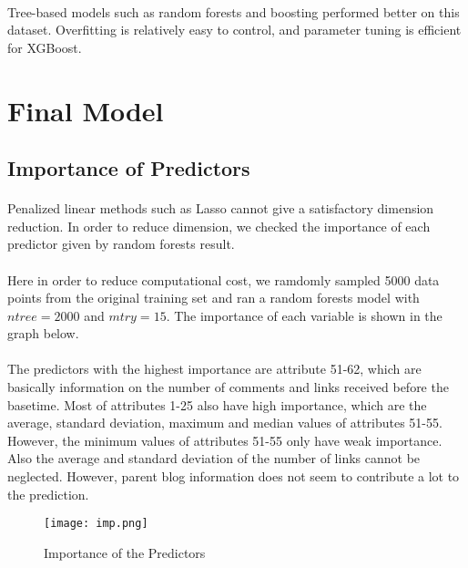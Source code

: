 \documentclass[paper=a4, fontsize=11pt]{scrartcl} %
\numberwithin{equation}{section} %
\numberwithin{figure}{section} %
\numberwithin{table}{section} %
\begin{document}
{\paragraph{}
Tree-based models such as random forests and boosting performed better on this dataset. Overfitting is relatively easy to control, and parameter tuning is efficient for XGBoost.

%
%
\section{Final Model}
\subsection{Importance of Predictors}
\paragraph{}
Penalized linear methods such as Lasso cannot give a satisfactory dimension reduction. In order to reduce dimension, we checked the importance of each predictor given by random forests result. 
\paragraph{}
Here in order to reduce computational cost, we ramdomly sampled 5000 data points from the original training set and ran a random forests model with \(ntree = 2000\) and \(mtry = 15\). The importance of each variable is shown in the graph below.
\paragraph{}
The predictors with the highest importance are attribute 51-62, which are basically information on the number of comments and links received before the basetime. Most of attributes 1-25 also have high importance, which are the average, standard deviation, maximum and median values of attributes 51-55. However, the minimum values of attributes 51-55 only have weak importance. Also the average and standard deviation of the number of links cannot be neglected. However, parent blog information does not seem to contribute a lot to the prediction.

\begin{figure}[H]
    \centering
        \texttt{[image: imp.png]} 
        \caption{Importance of the Predictors}
\end{figure}

}
\end{document}
